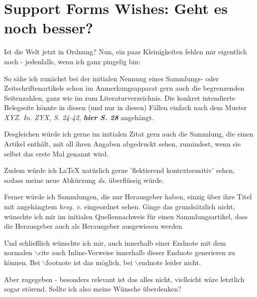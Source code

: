 %
%
%
%
%
\section{Support Forms Wishes: Geht es noch besser?}
Ist die Welt jetzt in Ordnung? Nun, ein paar Kleinigkeiten fehlen mir
eigentlich noch - jedenfalls, wenn ich ganz pingelig bin:

So sähe ich zunächst bei der initialen Nennung eines Sammlungs- oder
Zeitschriftenartikels schon im Anmerkungsapparat gern auch die begrenzenden
Seitenzahlen, ganz wie im zum Literaturverzeichnis. Die konkret
intendierte Belegseite könnte in diesen (und nur in diesen) Fällen einfach nach
dem Muster {\itshape XYZ. In. ZYX, S. 24-42, {\bfseries hier S. 28}} angehängt.

Desgleichen würde ich gerne im initialen Zitat gern auch die Sammlung, die einen
Artikel enthält, mit all ihren Angaben abgedruckt sehen, zumindest, wenn sie
selbst das erste Mal genannt wird.

Zudem würde ich LaTeX natürlich gerne 'flektierend kontextsensitiv'
sehen, sodass meine neue Abkürzung {\itshape ds.} überflüssig würde.

Ferner würde ich Sammlungen, die nur Herausgeber haben, einzig über ihre Titel
mit angehängtem {\itshape hrsg. v.} eingeordnet sehen. Ginge das grundsätzlich
nicht, wünschte ich mir im initialen Quellennachweis für einen Sammlungsartikel,
dass die Herausgeber auch als Herausgeber ausgewiesen werden 

Und schließlich wünschte ich mir, auch innerhalb einer Endnote mit dem normalen
$\backslash$cite auch Inline-Verweise innerhalb dieser Endnote generieren zu
können. Bei $\backslash$footnote ist das möglich, bei $\backslash$endnote leider
nicht.

Aber zugegeben - besonders relevant ist das alles nicht, vielleicht wäre
letztlich sogar störend. Sollte ich also meine Wünsche überdenken?

%
